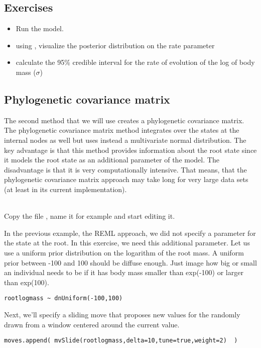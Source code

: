 \subsection*{Exercises}

\begin{itemize}
\item
Run the model.
\item
using , visualize the posterior distribution on the rate parameter 
\item
calculate the 95\% credible interval for the rate of evolution of the log of body mass ($\sigma$)
\end{itemize}


\vspace{5cm}






\subsection{Phylogenetic covariance matrix}

The second method that we will use creates a phylogenetic covariance matrix. The phylogenetic covariance matrix method integrates over the states  at the internal nodes as well but uses instead a multivariate normal distribution.
The key advantage is that this method provides information about the root state since it models the root state as an additional parameter of the model. The disadvantage is that it is very computationally intensive. That means, that the phylogenetic covariance matrix approach may take long for very large data sets (at least in its current implementation).

\noindent \\ \impmark Copy the file , name it for example  and start editing it.

In the previous example, the REML approach, we did not specify a parameter for the state at the root.
In this exercise, we need this additional parameter.
Let us use a uniform prior distribution on the logarithm of the root mass.
A uniform prior between -100 and 100 should be diffuse enough. Just image how big or small an individual needs to be if it has body mass smaller than exp(-100) or larger than exp(100).
{\tt \small \begin{snugshade*}
\begin{lstlisting}
rootlogmass ~ dnUniform(-100,100)
\end{lstlisting}
\end{snugshade*}}
Next, we'll specify a sliding move that proposes new values for the  randomly drawn from a window centered around the current value.
{\tt \small \begin{snugshade*}
\begin{lstlisting}
moves.append( mvSlide(rootlogmass,delta=10,tune=true,weight=2)  )
\end{lstlisting}
\end{snugshade*}}

